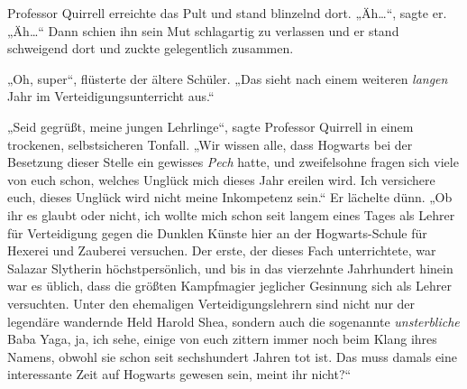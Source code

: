 Professor Quirrell erreichte das Pult und stand blinzelnd dort. „Äh…“, sagte er. „Äh…“ Dann schien ihn sein Mut schlagartig zu verlassen und er stand schweigend dort und zuckte gelegentlich zusammen.

„Oh, super“, flüsterte der ältere Schüler. „Das sieht nach einem weiteren \emph{langen} Jahr im Verteidigungsunterricht aus.“

„Seid gegrüßt, meine jungen Lehrlinge“, sagte Professor Quirrell in einem trockenen, selbstsicheren Tonfall. „Wir wissen alle, dass Hogwarts bei der Besetzung dieser Stelle ein gewisses \emph{Pech} hatte, und zweifelsohne fragen sich viele von euch schon, welches Unglück mich dieses Jahr ereilen wird. Ich versichere euch, dieses Unglück wird nicht meine Inkompetenz sein.“ Er lächelte dünn. „Ob ihr es glaubt oder nicht, ich wollte mich schon seit langem eines Tages als Lehrer für Verteidigung gegen die Dunklen Künste hier an der Hogwarts-Schule für Hexerei und Zauberei versuchen. Der erste, der dieses Fach unterrichtete, war Salazar Slytherin höchstpersönlich, und bis in das vierzehnte Jahrhundert hinein war es üblich, dass die größten Kampfmagier jeglicher Gesinnung sich als Lehrer versuchten. Unter den ehemaligen Verteidigungslehrern sind nicht nur der legendäre wandernde Held Harold Shea, sondern auch die sogenannte \emph{unsterbliche} Baba Yaga, ja, ich sehe, einige von euch zittern immer noch beim Klang ihres Namens, obwohl sie schon seit sechshundert Jahren tot ist. Das muss damals eine interessante Zeit auf Hogwarts gewesen sein, meint ihr nicht?“

